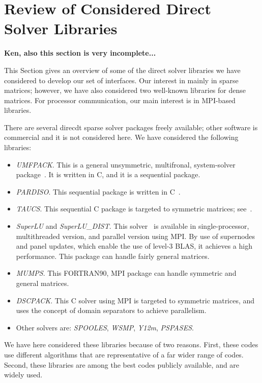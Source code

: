 \documentclass[acmtocl]{acmtrans2m}
\begin{document}
\section{Review of Considered Direct Solver Libraries}
\label{sec:review}

{\bf Ken, also this section is very incomplete...}
\bigskip

This Section gives an overview of some of the direct solver libraries
we have considered to develop our set of interfaces.
Our interest in mainly in sparse matrices; however, we have also considered
two well-known libraries for dense matrices. For processor communication, our
main interest is in MPI-based libraries.

There are several direcdt sparse solver packages freely available; other
software is commercial and it is not considered here. We have considered the
following libraries:

\begin{itemize}
\item
{\sl UMFPACK}. This is a general unsymmetric, multifronal, system-solver
package~\cite{umfpack-home-page}. It is written in C, and it is a sequential
package.
\item
{\sl PARDISO}. This sequential package is written in
C~\cite{oskl:04-etna,sg:04-fgcs}.
\item
{\sl TAUCS}. This sequential C package is targeted to symmetric matrices;
see~\cite{irony04parallel,rotkin04design,rozin04locality}.
\item 
{\sl SuperLU} and {\sl SuperLU\_DIST}. This solver~\cite{superlu-manual} is
available in single-processor, multithreaded version, and parallel version
using MPI. By use of supernodes and panel updates, which enable the use of
level-3 BLAS, it achieves a high performance. This package can handle fairly
general matrices.
\item
{\sl MUMPS}. This FORTRAN90, MPI package can handle symmetric and general
matrices.
\item
{\sl DSCPACK}. This C solver using MPI is targeted to symmetric matrices, and
uses the concept of domain separators to achieve parallelism.
\item
Other solvers are: {\sl SPOOLES}, {\sl WSMP}, {\sl Y12m}, {\sl PSPASES}.
\end{itemize}

We have here considered these libraries because of two reasons.
First, these codes use different algorithms that are
representative of a far wider range of codes. Second, these libraries are
among the best codes publicly available, and are widely used. 
\end{document}
